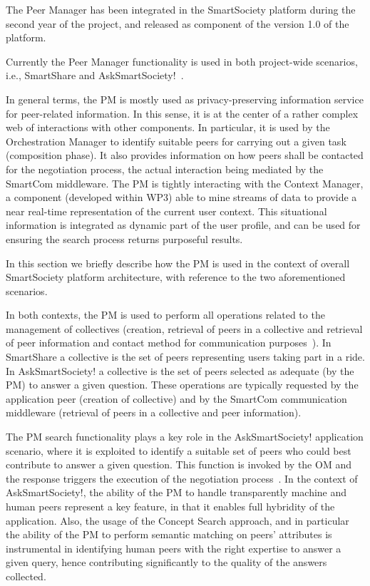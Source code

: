 The Peer Manager has been integrated in the SmartSociety platform
during the second year of the project, and released as component of
the version 1.0 of the platform. 

Currently the Peer Manager functionality
is used in both project-wide scenarios, i.e., SmartShare and
AskSmartSociety!~\cite{D8.2,D8.3}.

In general terms, the PM is mostly used as privacy-preserving
information service for peer-related information. In this sense, it is
at the center of a rather complex web of interactions with other
components. In particular, it is used by the Orchestration Manager to
identify suitable peers for carrying out a given task (composition
phase). It also provides information on how peers shall be contacted
for the negotiation process, the actual interaction being mediated by
the SmartCom middleware. The PM is tightly interacting with the
Context Manager, a component (developed within WP3) able to mine
streams of data to provide a near real-time representation of the
current user context. This situational information is integrated as
dynamic part of the user profile, and can be used for ensuring the
search process returns purposeful results. 

In this section we briefly describe how the PM is used in the context
of overall SmartSociety platform architecture, with reference to the
two aforementioned scenarios.

In both contexts, the PM is used to perform all operations related to
the management of collectives
(creation, retrieval of peers in a collective and retrieval of peer
information and contact method for communication
purposes~\cite{D8.2}). In SmartShare a collective is the set of peers
representing users taking part in a ride. In AskSmartSociety! a
collective is the set of peers selected as adequate (by the PM) to
answer a given question. These operations are typically requested by
the application peer (creation of collective) and by the SmartCom
communication middleware (retrieval of peers in a collective and peer information).

The PM search functionality plays a key role in the AskSmartSociety!
application scenario, where it is exploited to identify a suitable set
of peers who could best contribute to answer a given
question. This function is invoked by the OM and the response triggers
the execution of the negotiation process~\cite{D8.2}. In the context
of AskSmartSociety!, the ability of
the PM to handle transparently machine and human peers represent a key
feature, in that it enables full hybridity of the application. Also, the usage of the Concept Search approach, and in
particular the ability of the PM to perform semantic matching on
peers' attributes is instrumental in identifying human peers with the
right expertise to answer a given query, hence contributing
significantly to the quality of the answers collected.
